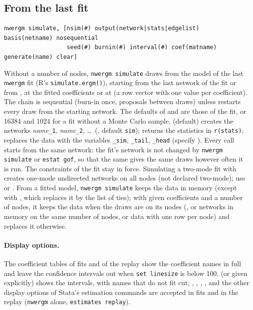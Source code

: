 \subsection{From the last fit}
\begin{lstlisting}
nwergm simulate, [nsim(#) output(network|stats|edgelist) basis(netname) nosequential
                  seed(#) burnin(#) interval(#) coef(matname) generate(name) clear]
\end{lstlisting}
Without a number of nodes, \texttt{nwergm simulate} draws from the model of the last \texttt{nwergm} fit (R's \texttt{simulate.ergm()}), starting from the last network of the fit or from , at the fitted coefficients or at  (a row vector with one value per coefficient). The chain is sequential (burn-in once,  proposals between draws) unless  restarts every draw from the starting network. The defaults of  and  are those of the fit, or 16384 and 1024 for a fit without a Monte Carlo sample.  (default) creates the networks \emph{name}\texttt{\_1}, \emph{name}\texttt{\_2}, \ldots\ (, default \texttt{sim});  returns the statistics in \texttt{r(stats)};  replaces the data with the variables \texttt{\_sim}, \texttt{\_tail}, \texttt{\_head} (specify ). Every call starts from the same network: the fit's network is not changed by \texttt{nwergm simulate} or \texttt{estat gof}, so that the same  gives the same draws however often it is run. The constraints of the fit stay in force. Simulating a two-mode fit with  creates one-mode undirected networks on all nodes (not declared two-mode); use  or . From a fitted model, \texttt{nwergm simulate} keeps the data in memory (except with , which replaces it by the list of ties); with given coefficients and a number of nodes, it keeps the data when the draws are on its nodes (, or networks in memory on the same number of nodes, or data with one row per node) and replaces it otherwise.

\paragraph{Display options.} The coefficient tables of fits and of the replay show the coefficient names in full and leave the confidence intervals out when \texttt{set linesize} is below 100.  (or  given explicitly) shows the intervals, with names that do not fit cut; , , , ,  and the other display options of Stata's estimation commands are accepted in fits and in the replay (\texttt{nwergm} alone, \texttt{estimates replay}).

